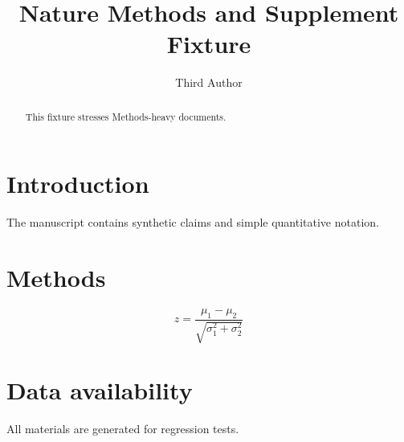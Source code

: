 \documentclass{nature}
\begin{document}
\title{Nature Methods and Supplement Fixture}
\author{Third Author}
\begin{abstract}
This fixture stresses Methods-heavy documents.
\end{abstract}
\section{Introduction}
The manuscript contains synthetic claims and simple quantitative notation.
\section{Methods}
\begin{equation}
  z = \frac{\mu_1-\mu_2}{\sqrt{\sigma_1^2+\sigma_2^2}}
\end{equation}
\section{Data availability}
All materials are generated for regression tests.

\end{document}
